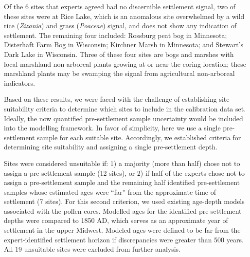 \documentclass[12pt]{article}
\begin{document}
Of the 6 sites that experts agreed had no discernible settlement
signal, two of these sites were at Rice Lake, which is an anomalous
site overwhelmed by a wild rice (\textit{Zizania}) and grass
(\textit{Poaceae}) signal, and does not show any indication of
settlement. The remaining four included: Rossburg peat bog in
Minnesota; Disterhaft Farm Bog in Wisconsin; Kirchner Marsh in
Minnesota; and Stewart’s Dark Lake in Wisconsin. Three of these four
sites are bogs and marshes with local marshland non-arboreal plants
growing at or near the coring location; these marshland plants may be
swamping the signal from agricultural non-arboreal indicators.

Based on these results, we were faced with the challenge of
establishing site suitability criteria to determine which sites to
include in the calibration data set. Ideally, the now quantified
pre-settlement sample uncertainty would be included into the modelling
framework. In favor of simplicity, here we use a single pre-settlement
sample for each suitable site. Accordingly, we established criteria
for determining site suitability and assigning a single pre-settlement
depth.



Sites were considered unsuitable if: 1) a majority (more than half)
chose not to assign a pre-settlement sample (12 sites), or 2) if half
of the experts chose not to assign a pre-settlement sample and the
remaining half identified pre-settlement samples whose estimated ages
were “far” from the approximate time of settlement (7 sites). For this
second criterion, we used existing age-depth models associated with
the pollen cores. Modelled ages for the identified pre-settlement
depths were compared to 1850 AD, which serves as an approximate year
of settlement in the upper Midwest.  Modeled ages were defined to be
far from the expert-identified settlement horizon if discrepancies
were greater than 500 years. All 19 unsuitable sites were excluded
from further analysis.
\end{document}

